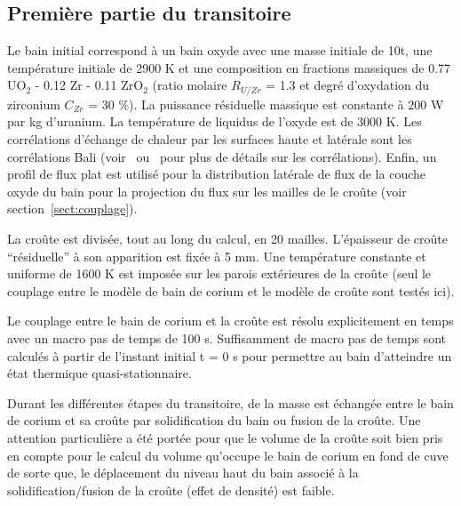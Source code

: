 \subsection{Première partie du transitoire}
Le bain initial correspond à un bain oxyde avec une masse initiale de 10t, une température initiale de 2900 K et une composition en fractions massiques de 0.77 UO$_2$ - 0.12 Zr - 0.11 ZrO$_2$ (ratio molaire $R_{U/Zr}$ = 1.3 et degré  d'oxydation du zirconium $C_{Zr}$ = 30 \%). La puissance résiduelle massique est constante à $200$ W par kg d'uranium. La température de liquidus de l'oxyde est de 3000 K. Les corrélations d'échange de chaleur par les surfaces haute et latérale sont les corrélations Bali (voir~\cite{Bonnet1999} ou~\cite{Tourniaire2009a} pour plus de détails sur les corrélations). Enfin, un profil de flux plat est utilisé pour la distribution latérale de flux de la couche oxyde du bain pour la projection du flux sur les mailles de le croûte (voir section~\ref{sect:couplage}).

La croûte est divisée, tout au long du calcul, en 20 mailles. L'épaisseur de croûte ``résiduelle'' à son apparition est fixée à 5 mm. Une température constante et uniforme de 1600 K est imposée sur les parois extérieures de la croûte (seul le couplage entre le modèle de bain de corium et le modèle de croûte sont testés ici).

Le couplage entre le bain de corium et la croûte est résolu explicitement en temps avec un macro pas de temps de 100 s. Suffisamment de macro pas de temps sont calculés à partir de l'instant initial t = 0 s pour permettre au bain d'atteindre un état thermique quasi-stationnaire.

Durant les différentes étapes du transitoire, de la masse est échangée entre le bain de corium et sa croûte par solidification du bain ou fusion de la croûte. Une attention particulière a été portée pour que le volume de la croûte soit bien pris en compte pour le calcul du volume qu'occupe le bain de corium en fond de cuve de sorte que, le déplacement du niveau haut du bain associé à la solidification/fusion de la croûte (effet de densité) est faible.


